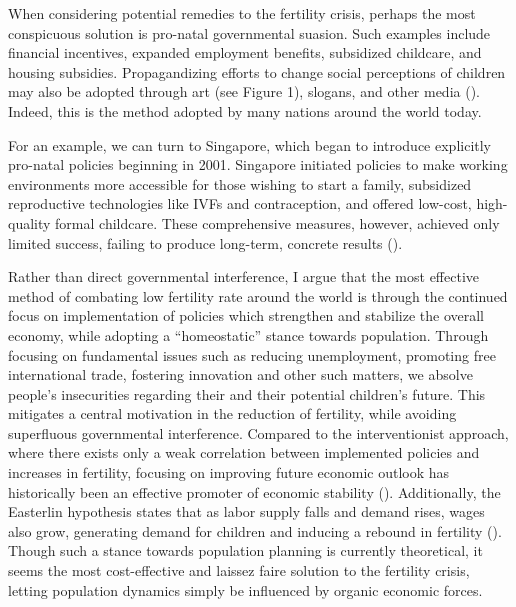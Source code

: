 \documentclass[12pt, a4paper, twoside]{article}
\begin{document}
When considering potential remedies to the fertility crisis, perhaps the most conspicuous solution is pro-natal governmental suasion. Such examples include financial incentives, expanded employment benefits, subsidized childcare, and housing subsidies. Propagandizing efforts to change social perceptions of children may also be adopted through art (see Figure 1), slogans, and other media (\cite[p.\ 37]{kohler2006low}). Indeed, this is the method adopted by many nations around the world today.

For an example, we can turn to Singapore, which began to introduce explicitly pro-natal policies beginning in 2001. Singapore initiated policies to make working environments more accessible for those wishing to start a family, subsidized reproductive technologies like IVFs and contraception, and offered low-cost, high-quality formal childcare. These comprehensive measures, however, achieved only limited success, failing to produce long-term, concrete results (\cite{tan2020lessons}).

Rather than direct governmental interference, I argue that the most effective method of combating low fertility rate around the world is through the continued focus on implementation of policies which strengthen and stabilize the overall economy, while adopting a “homeostatic” stance towards population. Through focusing on fundamental issues such as reducing unemployment, promoting free international trade, fostering innovation and other such matters, we absolve people’s insecurities regarding their and their potential children’s future. This mitigates a central motivation in the reduction of fertility, while avoiding superfluous governmental interference. Compared to the interventionist approach, where there exists only a weak correlation between implemented policies and increases in fertility, focusing on improving future economic outlook has historically been an effective promoter of economic stability (\cites[pp.\ 93–97]{kearney2023causes}{stern2022ways}). Additionally, the Easterlin hypothesis states that as labor supply falls and demand rises, wages also grow, generating demand for children and inducing a rebound in fertility (\cites{easterlin1987birth}[p.\ 31]{kohler2006low}). Though such a stance towards population planning is currently theoretical, it seems the most cost-effective and laissez faire solution to the fertility crisis, letting population dynamics simply be influenced by organic economic forces. 

\newpage
\end{document}
